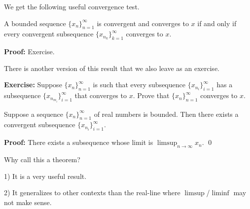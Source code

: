 \documentclass[10pt,aspectratio=169]{beamer}
\begin{document}
\begin{frame}

We get the following useful convergence test.

\begin{proposition}
A bounded sequence $\{ x_n \}_{n=1}^\infty$ is convergent and converges to $x$
if and only if
every convergent subsequence
$\{ x_{n_k} \}_{k=1}^\infty$ converges to $x$.
\end{proposition}

\pause
\textbf{Proof:} Exercise.

\pause
\medskip

There is another version of this result that we also leave as an exercise.

\medskip

\textbf{Exercise:}
Suppose $\{ x_n \}_{n=1}^\infty$ is such that every subsequence
$\{ x_{n_i} \}_{i=1}^\infty$ has a subsequence
$\{ x_{n_{m_i}} \}_{i=1}^\infty$ that converges to $x$.
Prove that $\{ x_n \}_{n=1}^\infty$ converges to $x$.

\end{frame}

\begin{frame}

\begin{theorem}
Suppose a sequence $\{ x_n \}_{n=1}^\infty$ of real numbers is bounded.
Then there exists a convergent subsequence $\{ x_{n_i} \}_{i=1}^\infty$.
\end{theorem}

\pause
\textbf{Proof:}
There exists a subsequence whose limit is $\displaystyle \limsup_{n\to\infty} x_n$.
\qed

\pause
\medskip

Why call this a theorem?

\pause
\medskip

1) It is a very useful result.

\pause
\medskip

2) It generalizes to other contexts than the real-line where
$\limsup$/$\liminf$ may not make sense.


\end{frame}
\end{document}
